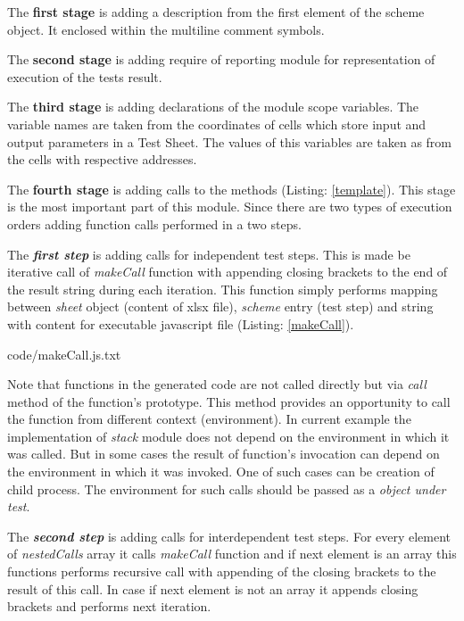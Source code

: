 The \textbf{first stage} is adding a description from the first element of the scheme object. It enclosed within the multiline comment symbols.


The \textbf{second stage} is adding require of reporting module for representation of execution of the tests result.


The \textbf{third stage} is adding declarations of the module scope variables. The variable names are taken from the coordinates of cells which store input and output parameters in a Test Sheet. The values of this variables are taken as from the cells with respective addresses.


The \textbf{fourth stage} is adding calls to the methods (Listing: \ref{template}). This stage is the most important part of this module. Since there are two types of execution orders adding function calls performed in a two steps. 


The \textit{\textbf{first step}} is adding calls for independent test steps. This is made be iterative call of \textit{makeCall} function with appending closing brackets to the end of the result string during each iteration. This function simply performs mapping between \textit{sheet} object (content of xlsx file), \textit{scheme} entry (test step) and string with content for executable javascript file (Listing: \ref{makeCall}).


{code/makeCall.js.txt}

Note that functions in the generated code are not called directly but via \textit{call} method of the function's prototype. This method provides an opportunity to call the function from different context (environment). In current example the implementation of \textit{stack} module does not depend on the environment in which it was called. But in some cases the result of function's invocation can depend on the environment in which it was invoked. One of such cases can be creation of child process. The environment for such calls should be passed as a \textit{object under test}.


The \textit{\textbf{second step}} is adding calls for interdependent test steps. For every  element of \textit{nestedCalls} array it calls \textit{makeCall} function and if next element is an array this functions performs recursive call with appending of the closing brackets to the result of this call. In case if next element is not an array it appends closing brackets and performs next iteration.

